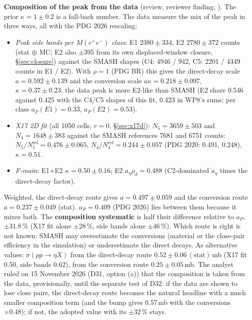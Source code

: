\documentclass[11pt,a4paper]{article}
\newcommand{\Mee}{\ensuremath{M(e^{+}e^{-})}\xspace}
\newcommand{\code}[1]{\texttt{\detokenize{#1}}}
\newcommand{\aEta}{\ensuremath{a_\eta}\xspace}
\newcommand{\aP}{\ensuremath{a_P}\xspace}
\newcommand{\rhod}{\ensuremath{\rho_d}\xspace}
\newcommand{\sigeta}{\ensuremath{\sigma(pp\to\eta X)}\xspace}
\begin{document}
\textbf{Composition of the peak from the data} (review, reviewer finding; \code{fix_numbers.py}). The prior $\kappa=1\pm0.2$ is a fall-back
number. The data measure the mix of the peak in three ways, all with the PDG 2026 rescaling:
\begin{itemize}\setlength{\itemsep}{0pt}
\item \emph{Peak side bands per \Mee class}: E1 $2380\pm334$, E2 $2780\pm372$ counts (stat $\oplus$ MC; E2 also $\pm395$ from its own displaced-window
      closure, \S\ref{sec:closure}) against the SMASH shapes (C4: 4946 / 942, C5: 2201 / 4349 counts in E1 / E2). With $\rho=1$ (PDG BR) this
      gives the direct-decay scale $a=0.592\pm0.139$ and the conversion scale $a\kappa=0.218\pm0.097$, $\kappa=0.37\pm0.23$; the data peak is
      more E2-like than SMASH (E2 share 0.546 against 0.425 with the C4/C5 shapes of this fit, 0.423 in WP8's sums; per class $\aP(E1)=0.33$, $\aP(E2)=0.53$).
\item \emph{X17 2D fit} (all 1050 cells, $r=0$, \S\ref{sec:x17d}): $N_5=3659\pm503$ and $N_4=1648\pm383$ against the SMASH references 7681 and 6751
      counts: $N_5/N_5^{\mathrm{ref}}=0.476\pm0.065$, $N_4/N_4^{\mathrm{ref}}=0.244\pm0.057$ (PDG 2020: 0.491, 0.248), $\kappa=0.51$.
\item \emph{F-main}: E1+E2 $\kappa=0.50\pm0.16$; E2 $\aEta\rhod=0.488$ (C2-dominated \aEta times the direct-decay factor).
\end{itemize}
Weighted, the direct-decay route gives $a=0.497\pm0.059$ and the conversion route $a=0.237\pm0.049$ (stat). \aP $=0.409$ (PDG 2026) lies between
them because it mixes both. The \textbf{composition systematic} is half their difference relative to \aP, $\pm31.8$\,\% (X17 fit alone
$\pm28$\,\%, side bands alone $\pm46$\,\%). Which route is right is not known: SMASH may overestimate the conversions (material or the
close-pair efficiency in the simulation) or underestimate the direct decays. As alternative values: \sigeta from the direct-decay route
$0.52\pm0.06\,(\mathrm{stat})$\,mb (X17 fit 0.50, side bands 0.62), from the conversion route $0.25\pm0.05$\,mb. The analyst ruled on
15 November 2026 (D31, option (a)) that the composition is taken from the data, provisionally, until the separate test of D32: if the data are
shown to lose close pairs, the direct-decay route becomes the natural headline with a much smaller composition term (and the bump gives 0.57\,mb
with the conversions $\times0.48$); if not, the adopted value with its $\pm32$\,\% stays.
\end{document}
